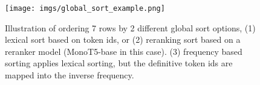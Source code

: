 \begin{figure}[t!]
{
\centering
    \texttt{[image: imgs/global\_sort\_example.png]}
    \caption{Illustration of ordering 7 rows by 2 different global sort options, (1) lexical sort based on token ids, or (2) reranking sort based on a reranker model (MonoT5-base in this case). (3) frequency based sorting applies lexical sorting, but the definitive token ids are mapped into the inverse frequency.}
    \label{fig:global_sort_example}
}
\end{figure}
